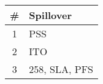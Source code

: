 \documentclass[crop]{standalone}
\begin{document}
    \begin{tabularx}{97pt}{|c|X|}
    \hline
        \# & Spillover \\
    \hline
        1 & PSS \\
    \hline
        2 & ITO \\
    \hline
        3 & 258, SLA, PFS \\
    \hline
    \end{tabularx}
\end{document}
